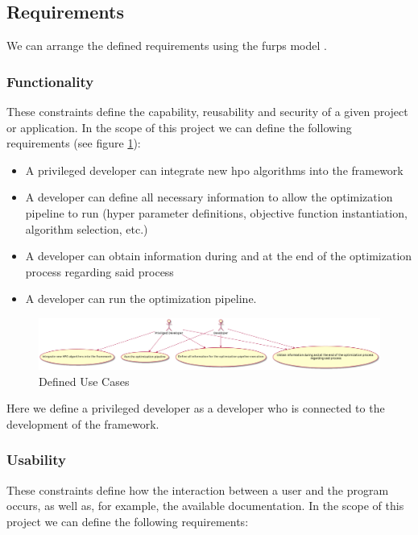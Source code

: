 
\subsection{Requirements}

We can arrange the defined requirements using the \acrfull{furps} model \parencite{furps}.

\subsubsection{Functionality}

These constraints define the capability, reusability and security of a given project or application. In the scope of this project we can define the following requirements (see figure \ref{fig:usecases}):

\begin{itemize}
	\item A privileged developer can integrate new \acrshort{hpo} algorithms into the framework
	\item A developer can define all necessary information to allow the optimization pipeline to run (hyper parameter definitions, objective function instantiation, algorithm selection, etc.)
	\item A developer can obtain information during and at the end of the optimization process regarding said process
	\item A developer can run the optimization pipeline.
\end{itemize}

\begin{figure}[hb]
\centering
\includegraphics[width=\textwidth]{images/domain_model.png}
\caption{Defined Use Cases}
\label{fig:usecases}
\end{figure}


Here we define a privileged developer as a developer who is connected to the development of the framework.

\subsubsection{Usability}

These constraints define how the interaction between a user and the program occurs, as well as, for example, the available documentation. In the scope of this project we can define the following requirements:

